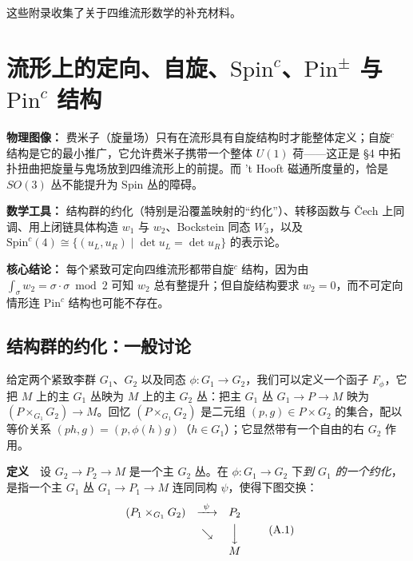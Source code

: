 
这些附录收集了关于四维流形数学的补充材料。

\section{流形上的定向、自旋、$\mathrm{Spin}^{c}$、$\mathrm{Pin}^{\pm}$ 与 $\mathrm{Pin}^{c}$ 结构}

\begin{keytakeaways}
\item \textbf{物理图像：} 费米子（旋量场）只有在流形具有自旋结构时才能整体定义；自旋$^{c}$ 结构是它的最小推广，它允许费米子携带一个整体 $U(1)$ 荷——这正是 §4 中拓扑扭曲把旋量与鬼场放到四维流形上的前提。而 't Hooft 磁通所度量的，恰是 $SO(3)$ 丛不能提升为 $\mathrm{Spin}$ 丛的障碍。
\item \textbf{数学工具：} 结构群的约化（特别是沿覆盖映射的“约化”）、转移函数与 Čech 上同调、用上闭链具体构造 $w_{1}$ 与 $w_{2}$、Bockstein 同态 $W_{3}$，以及 $\mathrm{Spin}^{c}(4)\cong\{(u_{L},u_{R})\mid\det u_{L}=\det u_{R}\}$ 的表示论。
\item \textbf{核心结论：} 每个紧致可定向四维流形都带自旋$^{c}$ 结构，因为由 $\int_{\sigma}w_{2}=\sigma\cdot\sigma\bmod2$ 可知 $w_{2}$ 总有整提升；但自旋结构要求 $w_{2}=0$，而不可定向情形连 $\mathrm{Pin}^{c}$ 结构也可能不存在。
\end{keytakeaways}

\subsection{结构群的约化：一般讨论}

给定两个紧致李群 $G_{1}$、$G_{2}$ 以及同态 $\phi:G_{1}\to G_{2}$，我们可以定义一个函子 $F_{\phi}$，它把 $M$ 上的主 $G_{1}$ 丛映为 $M$ 上的主 $G_{2}$ 丛：把主 $G_{1}$ 丛 $G_{1}\to P\to M$ 映为 $(P\times_{G_{1}}G_{2})\to M$。回忆 $(P\times_{G_{1}}G_{2})$ 是二元组 $(p,g)\in P\times G_{2}$ 的集合，配以等价关系 $(ph,g)=(p,\phi(h)g)$（$h\in G_{1}$）；它显然带有一个自由的右 $G_{2}$ 作用。

\medskip
\noindent\textbf{定义}　设 $G_{2}\to P_{2}\to M$ 是一个主 $G_{2}$ 丛。在 $\phi:G_{1}\to G_{2}$ 下\emph{到 $G_{1}$ 的一个约化}，是指一个主 $G_{1}$ 丛 $G_{1}\to P_{1}\to M$ 连同同构 $\psi$，使得下图交换：
\begin{equation}
\begin{array}{ccc}
(P_{1}\times_{G_{1}}G_{2}) & \xrightarrow{\ \psi\ } & P_{2}\\[4pt]
 & \searrow & {\Big\downarrow}\\[4pt]
 & & M
\end{array}
\tag{A.1}
\end{equation}

